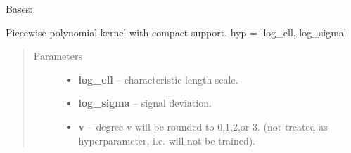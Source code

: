 \documentclass[letterpaper,10pt,english]{sphinxmanual}
\begin{document}
\begin{fulllineitems}
\label{pyGPs.Core:pyGPs.Core.cov.PiecePoly}
Bases: 

Piecewise polynomial kernel with compact support. 
hyp = {[}log\_ell, log\_sigma{]}
\begin{quote}\begin{description}
\item[{Parameters}] \leavevmode\begin{itemize}
\item {} 
\textbf{log\_ell} -- characteristic length scale.

\item {} 
\textbf{log\_sigma} -- signal deviation.

\item {} 
\textbf{v} -- degree v will be rounded to 0,1,2,or 3. (not treated as hyperparameter, i.e. will not be trained).

\end{itemize}

\end{description}\end{quote}

\begin{fulllineitems}
\label{pyGPs.Core:pyGPs.Core.cov.PiecePoly.dfunc}
\end{fulllineitems}


\begin{fulllineitems}
\label{pyGPs.Core:pyGPs.Core.cov.PiecePoly.dpp}
\end{fulllineitems}


\begin{fulllineitems}
\label{pyGPs.Core:pyGPs.Core.cov.PiecePoly.func}
\end{fulllineitems}



\end{fulllineitems}
\end{document}
